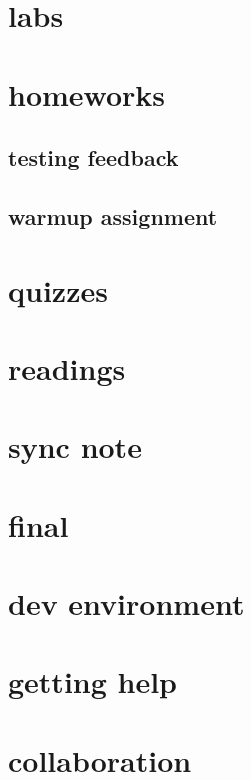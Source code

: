 \section{labs}


\section{homeworks}


\subsection{testing feedback}


\subsection{warmup assignment}


\section{quizzes}


\section{readings}


\section{sync note}


\section{final}


\section{dev environment}


\section{getting help}


\section{collaboration}


